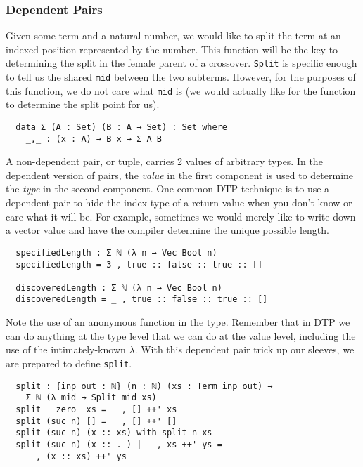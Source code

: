 \documentclass[runningheads,a4paper]{llncs}
\begin{document}
\subsubsection{Dependent Pairs}

Given some term and a natural number, we would like to split the term
at an indexed position represented by the number. This function will be the key
to determining the split in the female parent of a
crossover. \texttt{Split} is specific enough to tell us the shared
\texttt{mid} between the two subterms. However, for the purposes of this
function, we do not care what \texttt{mid} is (we would actually like for
the function to determine the split point for us).

\begin{verbatim}
  data Σ (A : Set) (B : A → Set) : Set where
    _,_ : (x : A) → B x → Σ A B
\end{verbatim}

A non-dependent pair, or tuple, carries 2 values of arbitrary
types. In the dependent version of pairs, the \textit{value} in the first
component is used to determine the \textit{type} in the second
component. One common DTP technique is to use a dependent pair to
hide the index type of a return value when you don't know or care what it will
be. For example, sometimes we would merely like to write down a vector
value and have the compiler determine the unique possible length.

\begin{verbatim}
  specifiedLength : Σ ℕ (λ n → Vec Bool n)
  specifiedLength = 3 , true :: false :: true :: []

  discoveredLength : Σ ℕ (λ n → Vec Bool n)
  discoveredLength = _ , true :: false :: true :: []
\end{verbatim}

Note the use of an anonymous function in the type. Remember that in DTP
we can do anything at the type level that we can do at the value
level, including the use of the intimately-known $\lambda$. With this
dependent pair trick up our sleeves, we are prepared to define \texttt{split}.

\begin{verbatim}
  split : {inp out : ℕ} (n : ℕ) (xs : Term inp out) →
    Σ ℕ (λ mid → Split mid xs)
  split   zero  xs = _ , [] ++' xs
  split (suc n) [] = _ , [] ++' []
  split (suc n) (x :: xs) with split n xs
  split (suc n) (x :: ._) | _ , xs ++' ys =
    _ , (x :: xs) ++' ys
\end{verbatim}
\end{document}
